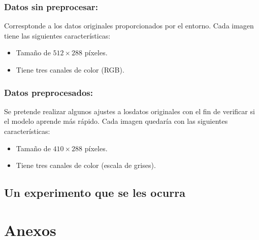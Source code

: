 \documentclass[journal]{IEEEtran}
\begin{document}
\subsubsection{Datos sin preprocesar:} Corresptonde a los datos originales proporcionados por el entorno. Cada imagen tiene las siguientes características:
\begin{itemize}
    \item Tamaño de $512\times288$ píxeles.
    \item Tiene tres canales de color (RGB).
\end{itemize}

\subsubsection{Datos preprocesados:} Se pretende realizar algunos ajustes a losdatos originales con el fin de verificar si el modelo aprende más rápido. Cada imagen quedaría con las siguientes características:
\begin{itemize}
    \item Tamaño de $410\times288$ píxeles.
    \item Tiene tres canales de color (escala de grises).
\end{itemize}

\subsection{Un experimento que se les ocurra}




\section*{Anexos}

    
\end{document}
